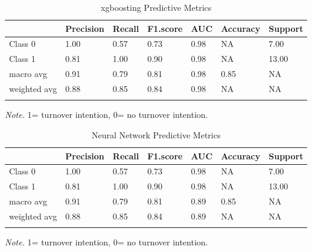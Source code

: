 \documentclass[
  man]{apa7}
\begin{document}
\begin{table}[tbp]

\begin{center}
\begin{threeparttable}

\caption{\label{tab:xgbtable200}xgboosting Predictive Metrics}

\begin{tabular}{lllllll}
\toprule
 & \multicolumn{1}{c}{Precision} & \multicolumn{1}{c}{Recall} & \multicolumn{1}{c}{F1.score} & \multicolumn{1}{c}{AUC} & \multicolumn{1}{c}{Accuracy} & \multicolumn{1}{c}{Support}\\
\midrule
Class 0 & 1.00 & 0.57 & 0.73 & 0.98 & NA & 7.00\\
Class 1 & 0.81 & 1.00 & 0.90 & 0.98 & NA & 13.00\\
macro avg & 0.91 & 0.79 & 0.81 & 0.98 & 0.85 & NA\\
weighted avg & 0.88 & 0.85 & 0.84 & 0.98 & NA & NA\\
\bottomrule
\addlinespace
\end{tabular}

\begin{tablenotes}[para]
\normalsize{\textit{Note.} 1= turnover intention, 0= no turnover intention.}
\end{tablenotes}

\end{threeparttable}
\end{center}

\end{table}

\begin{table}[tbp]

\begin{center}
\begin{threeparttable}

\caption{\label{tab:nn200}Neural Network Predictive Metrics}

\begin{tabular}{lllllll}
\toprule
 & \multicolumn{1}{c}{Precision} & \multicolumn{1}{c}{Recall} & \multicolumn{1}{c}{F1.score} & \multicolumn{1}{c}{AUC} & \multicolumn{1}{c}{Accuracy} & \multicolumn{1}{c}{Support}\\
\midrule
Class 0 & 1.00 & 0.57 & 0.73 & 0.98 & NA & 7.00\\
Class 1 & 0.81 & 1.00 & 0.90 & 0.98 & NA & 13.00\\
macro avg & 0.91 & 0.79 & 0.81 & 0.89 & 0.85 & NA\\
weighted avg & 0.88 & 0.85 & 0.84 & 0.89 & NA & NA\\
\bottomrule
\addlinespace
\end{tabular}

\begin{tablenotes}[para]
\normalsize{\textit{Note.} 1= turnover intention, 0= no turnover intention.}
\end{tablenotes}

\end{threeparttable}
\end{center}

\end{table}
\end{document}
